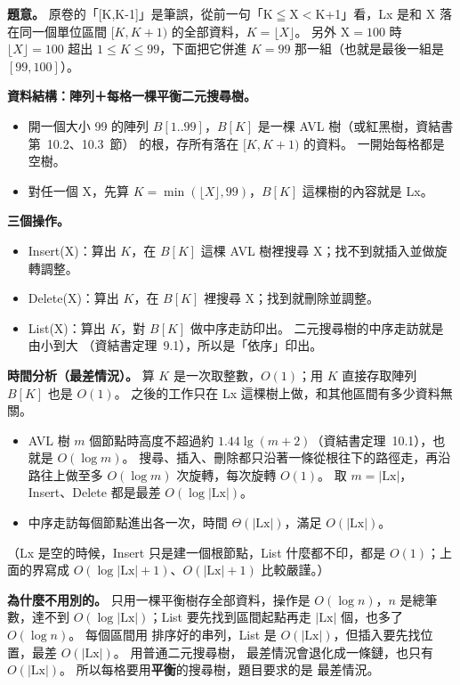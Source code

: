 \begin{pastsoln}
\textbf{題意。} 原卷的「[K,K-1]」是筆誤，從前一句「K$\leqq$X$<$K+1」看，Lx 是和 X 落在同一個單位區間
$[K, K+1)$ 的全部資料，$K = \lfloor X \rfloor$。 另外 X$=100$ 時 $\lfloor X \rfloor = 100$ 超出
$1 \le K \le 99$，下面把它併進 $K = 99$ 那一組（也就是最後一組是 $[99, 100]$）。

\textbf{資料結構：陣列＋每格一棵平衡二元搜尋樹。}
\begin{itemize}
\item 開一個大小 99 的陣列 $B[1..99]$，$B[K]$ 是一棵 AVL 樹（或紅黑樹，資結書第~10.2、10.3~節）
的根，存所有落在 $[K, K+1)$ 的資料。 一開始每格都是空樹。
\item 對任一個 X，先算 $K = \min(\lfloor X \rfloor, 99)$，$B[K]$ 這棵樹的內容就是 Lx。
\end{itemize}

\textbf{三個操作。}
\begin{itemize}
\item Insert(X)：算出 $K$，在 $B[K]$ 這棵 AVL 樹裡搜尋 X；找不到就插入並做旋轉調整。
\item Delete(X)：算出 $K$，在 $B[K]$ 裡搜尋 X；找到就刪除並調整。
\item List(X)：算出 $K$，對 $B[K]$ 做中序走訪印出。 二元搜尋樹的中序走訪就是由小到大
（資結書定理~9.1），所以是「依序」印出。
\end{itemize}

\textbf{時間分析（最差情況）。} 算 $K$ 是一次取整數，$O(1)$；用 $K$ 直接存取陣列 $B[K]$ 也是
$O(1)$。 之後的工作只在 Lx 這棵樹上做，和其他區間有多少資料無關。
\begin{itemize}
\item AVL 樹 $m$ 個節點時高度不超過約 $1.44 \lg(m+2)$（資結書定理~10.1），也就是 $O(\log m)$。
搜尋、插入、刪除都只沿著一條從根往下的路徑走，再沿路往上做至多 $O(\log m)$ 次旋轉，每次旋轉
$O(1)$。 取 $m = |\text{Lx}|$，Insert、Delete 都是最差 $O(\log |\text{Lx}|)$。
\item 中序走訪每個節點進出各一次，時間 $\Theta(|\text{Lx}|)$，滿足 $O(|\text{Lx}|)$。
\end{itemize}
（Lx 是空的時候，Insert 只是建一個根節點，List 什麼都不印，都是 $O(1)$；上面的界寫成
$O(\log |\text{Lx}| + 1)$、$O(|\text{Lx}| + 1)$ 比較嚴謹。）

\textbf{為什麼不用別的。} 只用一棵平衡樹存全部資料，操作是 $O(\log n)$，$n$ 是總筆數，達不到
$O(\log|\text{Lx}|)$；List 要先找到區間起點再走 $|\text{Lx}|$ 個，也多了 $O(\log n)$。 每個區間用
排序好的串列，List 是 $O(|\text{Lx}|)$，但插入要先找位置，最差 $O(|\text{Lx}|)$。 用普通二元搜尋樹，
最差情況會退化成一條鏈，也只有 $O(|\text{Lx}|)$。 所以每格要用\textbf{平衡}的搜尋樹，題目要求的是
最差情況。
\end{pastsoln}

